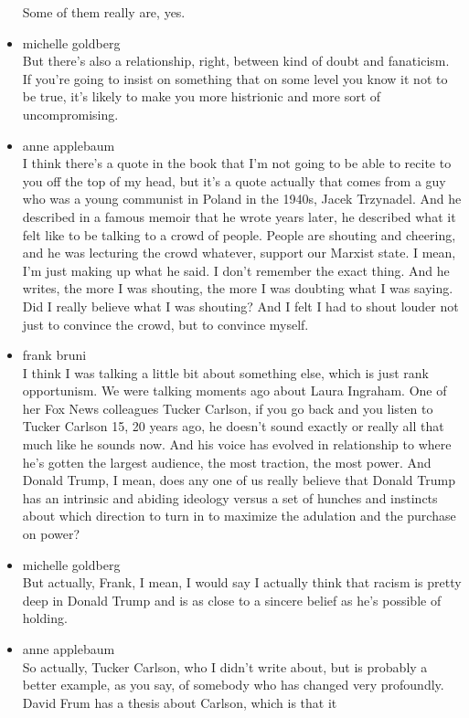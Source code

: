 \begin{itemize}
  Some of them really are, yes.
\item
  michelle goldberg\\
  But there's also a relationship, right, between kind of doubt and
  fanaticism. If you're going to insist on something that on some level
  you know it not to be true, it's likely to make you more histrionic
  and more sort of uncompromising.
\item
  anne applebaum\\
  I think there's a quote in the book that I'm not going to be able to
  recite to you off the top of my head, but it's a quote actually that
  comes from a guy who was a young communist in Poland in the 1940s,
  Jacek Trzynadel. And he described in a famous memoir that he wrote
  years later, he described what it felt like to be talking to a crowd
  of people. People are shouting and cheering, and he was lecturing the
  crowd whatever, support our Marxist state. I mean, I'm just making up
  what he said. I don't remember the exact thing. And he writes, the
  more I was shouting, the more I was doubting what I was saying. Did I
  really believe what I was shouting? And I felt I had to shout louder
  not just to convince the crowd, but to convince myself.
\item
  frank bruni\\
  I think I was talking a little bit about something else, which is just
  rank opportunism. We were talking moments ago about Laura Ingraham.
  One of her Fox News colleagues Tucker Carlson, if you go back and you
  listen to Tucker Carlson 15, 20 years ago, he doesn't sound exactly or
  really all that much like he sounds now. And his voice has evolved in
  relationship to where he's gotten the largest audience, the most
  traction, the most power. And Donald Trump, I mean, does any one of us
  really believe that Donald Trump has an intrinsic and abiding ideology
  versus a set of hunches and instincts about which direction to turn in
  to maximize the adulation and the purchase on power?
\item
  michelle goldberg\\
  But actually, Frank, I mean, I would say I actually think that racism
  is pretty deep in Donald Trump and is as close to a sincere belief as
  he's possible of holding.
\item
  anne applebaum\\
  So actually, Tucker Carlson, who I didn't write about, but is probably
  a better example, as you say, of somebody who has changed very
  profoundly. David Frum has a thesis about Carlson, which is that it

\end{itemize}
